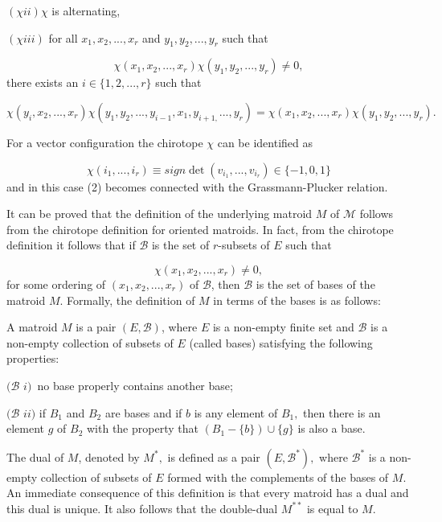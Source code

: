 \documentclass[a4paper,12pt]{article}
\begin{document}
$(\chi ii)\chi $ is alternating,

$(\chi iii)$ for all $x_{1},x_{2},...,x_{r}$ and $y_{1},y_{2},...,y_{r}$
such that

\begin{equation}
\chi (x_{1},x_{2},...,x_{r})\chi (y_{1},y_{2},...,y_{r})\neq 0,  \label{1}
\end{equation}
there exists an $i\in \{1,2,...,r\}$ such that

\begin{equation}
\chi (y_{i},x_{2},...,x_{r})\chi
(y_{1},y_{2},...,y_{i-1},x_{1},y_{i+1,}...,y_{r})=\chi
(x_{1},x_{2},...,x_{r})\chi (y_{1},y_{2},...,y_{r}).  \label{2}
\end{equation}

For a vector configuration the chirotope $\chi $ can be identified as

\begin{equation}
\chi (i_{1},...,i_{r})\equiv sign\det (v_{i_{1}},...,v_{i_{r}})\in \{-1,0,1\}
\label{3}
\end{equation}
and in this case (2) becomes connected with the Grassmann-Plucker relation.

It can be proved that the definition of the underlying matroid $M$ of $%
\mathcal{M}$ follows from the chirotope definition for oriented matroids. In
fact, from the chirotope definition it follows that if $\mathcal{B}$ is the
set of $r$-subsets of $E$ such that

\begin{equation}
\chi (x_{1},x_{2},...,x_{r})\neq 0,  \label{4}
\end{equation}
for some ordering of $(x_{1},x_{2},...,x_{r})$ of $\mathcal{B}$, then $%
\mathcal{B}$ is the set of bases of the matroid $M$. Formally, the
definition of $M$ in terms of the bases is as follows:

A matroid $M$ is a pair $(E,\mathcal{B})$, where $E$ is a non-empty finite
set and $\mathcal{B}$ is a non-empty collection of subsets of $E$ (called
bases) satisfying the following properties:

$(\mathcal{B}$ $\mathit{i)}$\textit{\ }no base properly contains another
base;

$(\mathcal{B}$ $\mathit{ii)}$ if $B_{1}$ and $B_{2}$ are bases and if $b$ is
any element of $B_{1},$ then there is an element $g$ of $B_{2}$ with the
property that $(B_{1}-\{b\})\cup \{g\}$ is also a base.

The dual of $M$, denoted by $M^{\ast },$ is defined as a pair $(E,\mathcal{B}%
^{\ast }),$ where $\mathcal{B}^{\ast }$ is a non-empty collection of subsets
of $E$ formed with the complements of the bases of $M$. An immediate
consequence of this definition is that every matroid has a dual and this
dual is unique. It also follows that the double-dual $M^{\ast \ast }$ is
equal to $M$.
\end{document}
